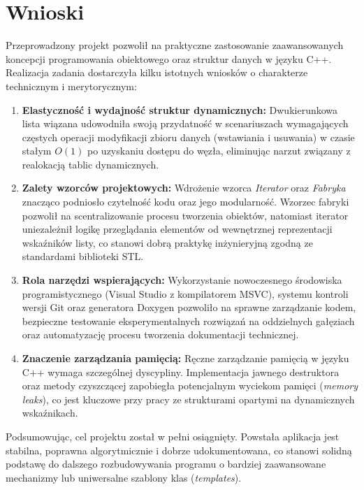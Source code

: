 \newpage
\section{Wnioski}		%

Przeprowadzony projekt pozwolił na praktyczne zastosowanie zaawansowanych koncepcji programowania obiektowego oraz struktur danych w języku C++. Realizacja zadania dostarczyła kilku istotnych wniosków o charakterze technicznym i merytorycznym:

\begin{enumerate}
    \item \textbf{Elastyczność i wydajność struktur dynamicznych:} Dwukierunkowa lista wiązana udowodniła swoją przydatność w scenariuszach wymagających częstych operacji modyfikacji zbioru danych (wstawiania i usuwania) w czasie stałym $O(1)$ po uzyskaniu dostępu do węzła, eliminując narzut związany z realokacją tablic dynamicznych.
    \item \textbf{Zalety wzorców projektowych:} Wdrożenie wzorca \textit{Iterator} oraz \textit{Fabryka} znacząco podniosło czytelność kodu oraz jego modularność. Wzorzec fabryki pozwolił na scentralizowanie procesu tworzenia obiektów, natomiast iterator uniezależnił logikę przeglądania elementów od wewnętrznej reprezentacji wskaźników listy, co stanowi dobrą praktykę inżynieryjną zgodną ze standardami biblioteki STL.
    \item \textbf{Rola narzędzi wspierających:} Wykorzystanie nowoczesnego środowiska programistycznego (Visual Studio z kompilatorem MSVC), systemu kontroli wersji Git oraz generatora Doxygen pozwoliło na sprawne zarządzanie kodem, bezpieczne testowanie eksperymentalnych rozwiązań na oddzielnych gałęziach oraz automatyzację procesu tworzenia dokumentacji technicznej.
    \item \textbf{Znaczenie zarządzania pamięcią:} Ręczne zarządzanie pamięcią w języku C++ wymaga szczególnej dyscypliny. Implementacja jawnego destruktora oraz metody czyszczącej zapobiegła potencjalnym wyciekom pamięci (\textit{memory leaks}), co jest kluczowe przy pracy ze strukturami opartymi na dynamicznych wskaźnikach.
\end{enumerate}

Podsumowując, cel projektu został w pełni osiągnięty. Powstała aplikacja jest stabilna, poprawna algorytmicznie i dobrze udokumentowana, co stanowi solidną podstawę do dalszego rozbudowywania programu o bardziej zaawansowane mechanizmy lub uniwersalne szablony klas (\textit{templates}).
